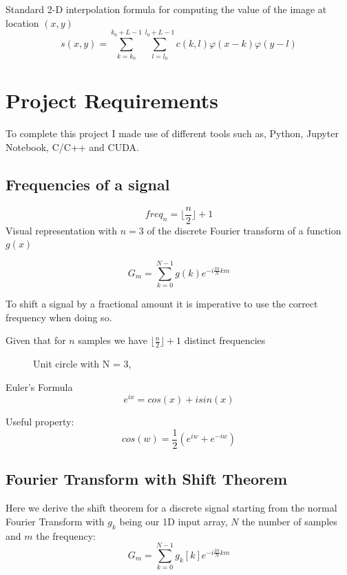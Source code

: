 \documentclass[]{usiinfbachelorproject}
\begin{document}
	Standard 2-D interpolation formula for computing the value of the image at location $(x,y)$
	\begin{equation}
		s(x,y) = \sum_{k = k_0}^{k_0+L-1}\sum_{l=l_0}^{l_0+L-1} c(k,l)\varphi(x-k)\varphi(y-l)
	\end{equation}
	
	\fi
	

	\section{Project Requirements}
	To complete this project I made use of different tools such as, Python, Jupyter Notebook, C/C++ and CUDA.
	
	
	
	\subsection{Frequencies of a signal}
	\begin{equation}
		freq_{n} = \lfloor \frac{n}{2} \rfloor + 1
	\end{equation}
	Visual representation with $n=3$ of the discrete Fourier transform of a function $g(x)$
	
	\begin{equation*}
		G_m = \displaystyle\sum_{k=0}^{N-1}g(k)e^{-i \frac{2\pi}{N}km}
	\end{equation*}
	
	To shift a signal by a fractional amount it is imperative to use the correct frequency when doing so.
	
	Given that for $n$ samples we have $\lfloor \frac{n}{2} \rfloor + 1$ distinct frequencies
	
	
	\begin{figure}
		\centering
		
		\caption{Unit circle with N = 3, }
	\end{figure}
	
	Euler's Formula
	\begin{equation}
		e^{ix} = cos(x)  + i sin(x)
	\end{equation}
	
	Useful property:
	\begin{equation}
		cos(w)= \frac{1}{2}(e^{iw}+ e^{-iw})
	\end{equation}
	
	
	\subsection{Fourier Transform with Shift Theorem}
	Here we derive the shift theorem for a discrete signal starting from the normal Fourier Transform with $g_k$ being our 1D input array, $N$ the number of samples and $m$ the frequency:
	\begin{equation*}
		G_m = \displaystyle\sum_{k=0}^{N-1}g_k[k]e^{-i \frac{2\pi}{N} km}
	\end{equation*}
	
\end{document}
